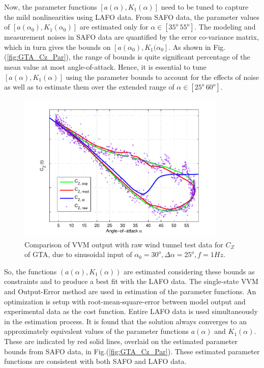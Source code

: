 \documentclass{AIAA}
\begin{document}
Now, the parameter functions $[a(\alpha),K_1(\alpha)]$ need to be tuned to capture the mild nonlinearities using LAFO data. From SAFO data, the parameter values of $[a(\alpha_0),K_1(\alpha_0)]$ are estimated only for $\alpha \in [35^o \, 55^o]$. The modeling and measurement noises in SAFO data are quantified by the error co-variance matrix, which in turn gives the bounds on $[a(\alpha_0), K_1(\alpha_0]$. As shown in Fig.(\ref{fig:GTA_Cz_Par}), the range of bounds is quite significant percentage of the mean value at most angle-of-attack. Hence, it is essential to tune $[a(\alpha),K_1(\alpha)]$ using the parameter bounds to account for the effects of noise as well as to estimate them over the extended range of $\alpha \in [25^o \, 60^o]$.
%
%
\begin{figure}
\centering
\includegraphics[width=100mm]{LA83_sim}
\caption{Comparison of VVM output with raw wind tunnel test data for $C_Z$ of GTA, due to sinusoidal input of $\alpha_0=30^o, \Delta \alpha =25^o, f=1 Hz$.}
\label{fig:GTA_Cz_R83}
\end{figure}

So, the functions $(a(\alpha), K_1(\alpha))$ are estimated considering these bounds as constraints and to produce a best fit with the LAFO data. The single-state VVM and Output-Error method are used in estimation of the parameter functions. An optimization is setup with root-mean-square-error between model output and experimental data as the cost function. Entire LAFO data is used simultaneously in the estimation process. It is found that the solution always converges to an approximately equivalent values of the parameter functions $a(\alpha)$ and $K_1(\alpha)$. These are indicated by red solid lines, overlaid on the estimated parameter bounds from SAFO data, in Fig.(\ref{fig:GTA_Cz_Par}). These estimated parameter functions are consistent with both SAFO and LAFO data.
\end{document}
